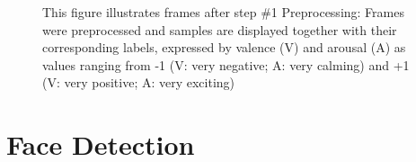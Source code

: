 \begin{figure}[htbp]
  \hfill
  \caption[ER pipeline step \#1: Preprocessing]{This figure illustrates frames after step \#1 Preprocessing: Frames were preprocessed and samples are displayed together with their corresponding labels, expressed by valence (V) and arousal (A) as values ranging from -1 (V: very negative; A: very calming) and +1 (V: very positive; A: very exciting)}
  \label{fig:MethodologyPreprocess}
\end{figure}


\section{Face Detection} \label{sec:FaceDetection}


